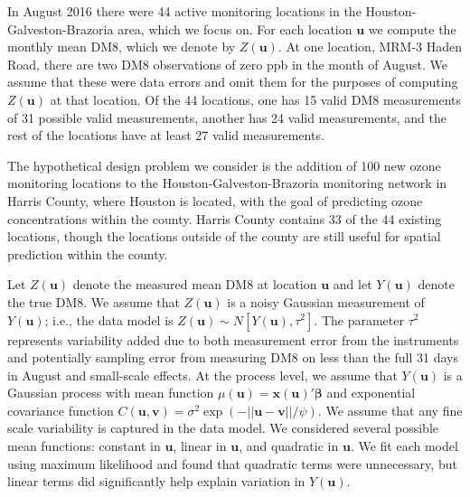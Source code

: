 \documentclass[cmbright]{staauth}
\begin{document}
In August 2016 there were 44 active monitoring locations in the Houston-Galveston-Brazoria area, which we focus on. For each location $\bm{u}$ we compute the monthly mean DM8, which we denote by $Z(\bm{u})$. At one location, MRM-3 Haden Road, there are two DM8 observations of zero ppb in the month of August. We assume that these were data errors and omit them for the purposes of computing $Z(\bm{u})$ at that location. Of the 44 locations, one has 15 valid DM8 measurements of 31 possible valid measurements, another has 24 valid measurements, and the rest of the locations have at least 27 valid measurements.

The hypothetical design problem we consider is the addition of 100 new ozone monitoring locations to the Houston-Galveston-Brazoria monitoring network in Harris County, where Houston is located, with the goal of predicting ozone concentrations within the county. Harris County contains 33 of the 44 existing locations, though the locations outside of the county are still useful for spatial prediction within the county.

Let $Z(\bm{u})$ denote the measured mean DM8 at location $\bm{u}$ and let $Y(\bm{u})$ denote the true DM8. We assume that $Z(\bm{u})$ is a noisy Gaussian measurement of $Y(\bm{u})$; i.e., the data model is $Z(\bm{u}) \sim N[Y(\bm{u}), \tau^2]$. The parameter $\tau^2$ represents variability added due to both measurement error from the instruments and potentially sampling error from measuring DM8 on less than the full 31 days in August and small-scale effects. At the process level, we assume that $Y(\bm{u})$ is a Gaussian process with mean function $\mu(\bm{u}) = \bm{x}(\bm{u})'\bm{\beta}$ and exponential covariance function $C(\bm{u},\bm{v}) = \sigma^2\exp(-||\bm{u} - \bm{v}||/\psi)$. We assume that any fine scale variability is captured in the data model. We considered several possible mean functions: constant in $\bm{u}$, linear in $\bm{u}$, and quadratic in $\bm{u}$. We fit each model using maximum likelihood and found that quadratic terms were unnecessary, but linear terms did significantly help explain variation in $Y(\bm{u})$.
\end{document}
